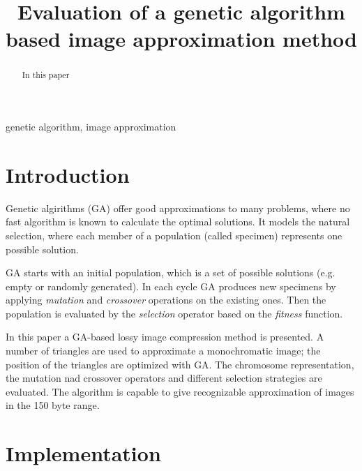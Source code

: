 \documentclass[conference]{IEEEtran}
\begin{document}
\title{Evaluation of a genetic algorithm based image approximation method}

\author{
}

\maketitle

\begin{abstract}
In this paper
\end{abstract}

\begin{IEEEkeywords}
genetic algorithm, image approximation
\end{IEEEkeywords}

\section{Introduction}

Genetic algirithms (GA) \cite{b1} offer good approximations to many
problems, where no fast algorithm is known to calculate
the optimal solutions. It models the natural selection,
where each member of a population (called specimen)
represents one possible solution.

GA starts with an initial population, which is a set of
possible solutions (e.g. empty or randomly generated).
In each cycle GA produces new specimens by applying
\emph{mutation} and \emph{crossover} operations on the
existing ones. Then the population is evaluated by
the \emph{selection} operator based on the \emph{fitness}
function.

In this paper a GA-based lossy image compression method is
presented. A number of triangles are used to approximate
a monochromatic image; the position of the triangles are
optimized with GA. The chromosome representation, the
mutation nad crossover operators and different selection
strategies are evaluated. The algorithm is capable to give
recognizable approximation of images in the 150 byte range.

\section{Implementation}
\end{document}
